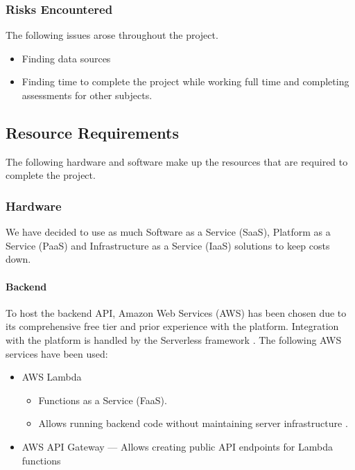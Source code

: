 \documentclass[a4paper,11pt]{article}
\begin{document}
\subsubsection{Risks Encountered}

The following issues arose throughout the project.

\begin{itemize}
  \item Finding data sources
  \item Finding time to complete the project while working full time and
    completing assessments for other subjects.
\end{itemize}

\subsection{Resource Requirements}

The following hardware and software make up the resources that are required to
complete the project.

\subsubsection{Hardware}

We have decided to use as much Software as a Service (SaaS), Platform as a
Service (PaaS) and Infrastructure as a Service (IaaS) solutions to keep costs
down. \autocite[4]{project-spec:2}

\paragraph{Backend}

To host the backend API, Amazon Web Services (AWS) has been chosen due to its
comprehensive free tier and prior experience with the platform. Integration with
the platform is handled by the Serverless framework \autocite{serverless:3}. The
following AWS services have been used:

\begin{itemize}
  \item AWS Lambda
    \begin{itemize}
      \item Functions as a Service (FaaS).
      \item Allows running backend code without maintaining server
        infrastructure \autocite{aws:4}.
    \end{itemize}
  \item AWS API Gateway --- Allows creating public API endpoints for Lambda
    functions \autocite{aws:5}
\end{itemize}
\end{document}

